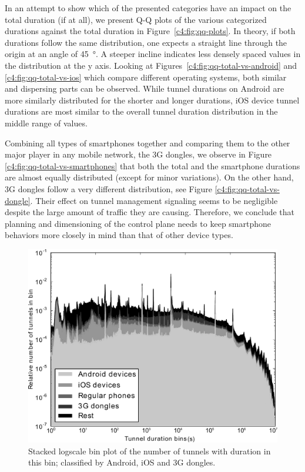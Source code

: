 In an attempt to show which of the presented categories have an impact on the total duration (if at all), we present Q-Q plots of the various categorized durations against the total duration in Figure~\ref{c4:fig:qq-plots}. In theory, if both durations follow the same distribution, one expects a straight line through the origin at an angle of \SI{45}{\degree}. A steeper incline indicates less densely spaced values in the distribution at the y axis. Looking at Figures~\ref{c4:fig:qq-total-vs-android} and \ref{c4:fig:qq-total-vs-ios} which compare different operating systems, both similar and dispersing parts can be observed. While tunnel durations on Android  are more similarly distributed for the shorter and longer durations, iOS device tunnel durations are most similar to the overall tunnel duration distribution in the middle range of values.

Combining all types of smartphones together and comparing them to the other major player in any mobile network, the \gls{3G} dongles, we observe in Figure \ref{c4:fig:qq-total-vs-smartphones} that both the total and the smartphone durations are almost equally distributed (except for minor variations). On the other hand, \gls{3G} dongles follow a very different distribution, see Figure \ref{c4:fig:qq-total-vs-dongle}. Their effect on tunnel management signaling seems to be negligible despite the  large amount of traffic they are causing. Therefore, we conclude that planning and dimensioning of the control plane needs to keep smartphone behaviors more closely in mind than that of other device types.


\begin{figure}[htb]
	\centering
	\includegraphics[width=1.0\textwidth]{images/stacked-durations-2-fixed.pdf}
	\caption{Stacked logscale bin plot of the number of tunnels with duration in this bin; classified by Android, iOS and 3G dongles.}
	\label{c4:fig:stacked-durations}
\end{figure}

